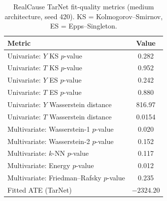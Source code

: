\documentclass[manuscript,review,natbib=false]{acmart}
\begin{document}
\begin{table}[]
\tiny
\centering
\caption{RealCause TarNet fit-quality metrics (medium architecture, seed 420). KS = Kolmogorov--Smirnov, ES = Epps--Singleton.}
\label{tab:realcause_fit}
{%
\begin{tabular}{lc}
\hline
Metric & Value \\
\hline
Univariate: $Y$ KS $p$-value & 0.282 \\
Univariate: $T$ KS $p$-value & 0.952 \\
Univariate: $Y$ ES $p$-value & 0.242 \\
Univariate: $T$ ES $p$-value & 0.880 \\
Univariate: $Y$ Wasserstein distance & 816.97 \\
Univariate: $T$ Wasserstein distance & 0.0154 \\
Multivariate: Wasserstein-1 $p$-value & 0.020 \\
Multivariate: Wasserstein-2 $p$-value & 0.152 \\
Multivariate: $k$-NN $p$-value & 0.117 \\
Multivariate: Energy $p$-value & 0.012 \\
Multivariate: Friedman--Rafsky $p$-value & 0.235 \\
Fitted ATE (TarNet) & $-2324.20$ \\
\hline
\end{tabular}%
}
\end{table}
\end{document}
